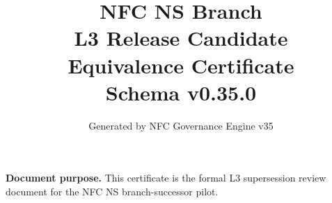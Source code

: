 \documentclass[11pt]{article}
\title{NFC NS Branch\\L3 Release Candidate\\Equivalence Certificate\\[1ex]\large Schema v0.35.0}
\author{Generated by NFC Governance Engine v35}
\date{}
\begin{document}
\maketitle
\tableofcontents
\bigskip
\noindent\textbf{Document purpose.} This certificate is the formal L3 supersession
review document for the NFC NS branch-successor pilot.
\vspace{1em}

\end{document}
